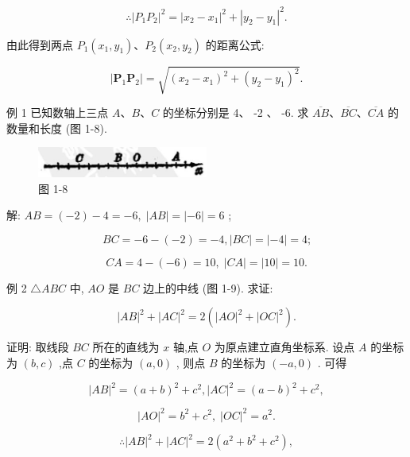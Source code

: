 \documentclass[lang=cn,newtx,10pt,scheme=chinese]{elegantbook}
\begin{document}
\[
  \therefore {\left| {P}_{1}{P}_{2}\right| }^{2} = {\left| {x}_{2} - {x}_{1}\right| }^{2} + {\left| {y}_{2} - {y}_{1}\right| }^{2}\text{.}
\]

由此得到两点 \({P}_{1}\left( {{x}_{1},{y}_{1}}\right) \text{、}{P}_{2}\left( {{x}_{2},{y}_{2}}\right)\) 的距离公式:

\[
  \left| {{\mathbf{P}}_{1}{\mathbf{P}}_{2}}\right| = \sqrt{{\left( {x}_{2} - {x}_{1}\right) }^{2} + {\left( {y}_{2} - {y}_{1}\right) }^{2}}.
\]

例 1 已知数轴上三点 \(A\text{、}B\text{、}C\) 的坐标分别是 4、 -2 、 -6. 求 \(\overline{AB}\text{、}\overline{BC}\text{、}\overline{CA}\) 的数量和长度 (图 1-8).

\begin{figure}[h]
  \centering
  \includegraphics[max width=0.5\textwidth]{images/01912cc2-ffb6-728e-9ae7-b113ff05c64b_10_794091.jpg}
  \caption{图 1-8}
\end{figure}



解: \({AB} = \left( {-2}\right) - 4 = - 6,\;\left| {AB}\right| = \left| {-6}\right| = 6\) ;

\[
    {BC} = - 6 - \left( {-2}\right) = - 4,\left| {BC}\right| = \left| {-4}\right| = 4\text{;}
\]

\[
    {CA} = 4 - \left( {-6}\right) = {10},\;\left| {CA}\right| = \left| {10}\right| = {10}.
\]

例 2 \(\bigtriangleup {ABC}\) 中, \({AO}\) 是 \({BC}\) 边上的中线 (图 1-9). 求证:

\[
    {\left| AB\right| }^{2} + {\left| AC\right| }^{2} = 2\left( {{\left| AO\right| }^{2} + {\left| OC\right| }^{2}}\right) .
\]

证明: 取线段 \({BC}\) 所在的直线为 \(x\) 轴,点 \(O\) 为原点建立直角坐标系. 设点 \(A\) 的坐标为 \(\left( {b,c}\right)\) ,点 \(C\) 的坐标为 \(\left( {a,0}\right)\) , 则点 \(B\) 的坐标为 \(\left( {-a,0}\right)\) . 可得

\[
    {\left| AB\right| }^{2} = {\left( a + b\right) }^{2} + {c}^{2},{\left| AC\right| }^{2} = {\left( a - b\right) }^{2} + {c}^{2},
\]

\[
    {\left| AO\right| }^{2} = {b}^{2} + {c}^{2},\;{\left| OC\right| }^{2} = {a}^{2}.
\]

\[
  \therefore {\left| AB\right| }^{2} + {\left| AC\right| }^{2} = 2\left( {{a}^{2} + {b}^{2} + {c}^{2}}\right) ,
\]
\end{document}
